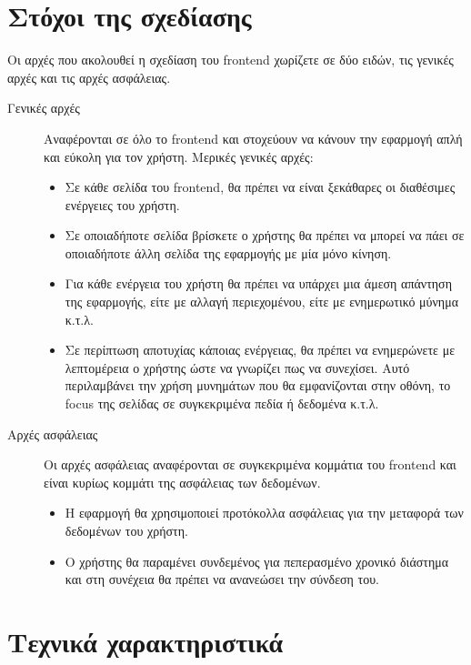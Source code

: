 \section{Στόχοι της σχεδίασης}
Οι αρχές που ακολουθεί η σχεδίαση του frontend χωρίζετε σε δύο ειδών, τις γενικές αρχές και τις αρχές ασφάλειας.
\begin{description}
\item [Γενικές αρχές] Αναφέρονται σε όλο το frontend και στοχεύουν να κάνουν την εφαρμογή απλή και εύκολη για τον χρήστη.
\newline
Μερικές γενικές αρχές:


\begin{itemize}
  \item Σε κάθε σελίδα του frontend, θα πρέπει να είναι ξεκάθαρες οι διαθέσιμες ενέργειες του χρήστη.
  \item Σε οποιαδήποτε σελίδα βρίσκετε ο χρήστης θα πρέπει να μπορεί να πάει σε οποιαδήποτε άλλη σελίδα της εφαρμογής με μία μόνο κίνηση.
   \item Για κάθε ενέργεια του χρήστη θα πρέπει να υπάρχει μια άμεση απάντηση της εφαρμογής, είτε με αλλαγή περιεχομένου, είτε με ενημερωτικό μύνημα κ.τ.λ.
   \item Σε περίπτωση αποτυχίας κάποιας ενέργειας, θα πρέπει να ενημερώνετε με λεπτομέρεια ο χρήστης ώστε να γνωρίζει πως να συνεχίσει. Αυτό περιλαμβάνει την χρήση μυνημάτων που θα εμφανίζονται στην οθόνη, το focus της σελίδας σε συγκεκριμένα πεδία ή δεδομένα κ.τ.λ.
\end{itemize}


\item [Αρχές ασφάλειας] Οι αρχές ασφάλειας αναφέρονται σε συγκεκριμένα κομμάτια του frontend και είναι κυρίως κομμάτι της ασφάλειας των δεδομένων.

\begin{itemize}
  \item Η εφαρμογή θα χρησιμοποιεί προτόκολλα ασφάλειας για την μεταφορά των δεδομένων του χρήστη.
  \item Ο χρήστης θα παραμένει συνδεμένος για πεπερασμένο χρονικό διάστημα και στη συνέχεια θα πρέπει να ανανεώσει την σύνδεση του.
\end{itemize}

\end{description}

\section{Τεχνικά χαρακτηριστικά}


